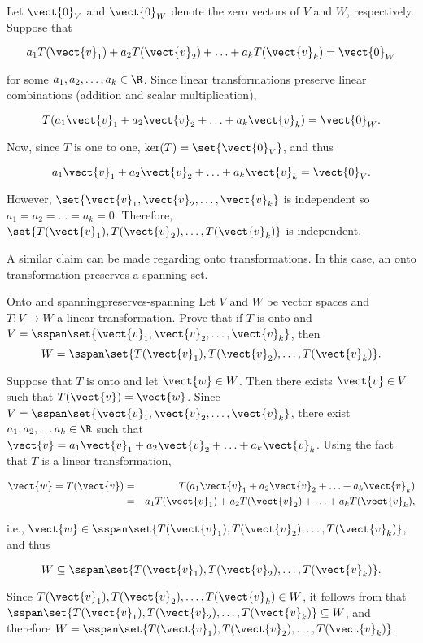 \begin{solution}
Let $\vect{0}_V$ and $\vect{0}_W$ denote the zero vectors of $V$ and $W$,
respectively.
Suppose that

\[ a_1T(\vect{v}_1) + a_2T(\vect{v}_2) +\ldots +a_kT(\vect{v}_k) =\vect{0}_W \]

for some $a_1, a_2, \ldots, a_k\in\R$.
Since linear transformations preserve linear combinations (addition
and scalar multiplication),

\[ T(a_1\vect{v}_1 + a_2\vect{v}_2 +\ldots +a_k\vect{v}_k) =\vect{0}_W. \]

Now, since $T$ is one to one, $\ker(T)=\set{\vect{0}_V}$, and thus

\[ a_1\vect{v}_1 + a_2\vect{v}_2 +\ldots +a_k\vect{v}_k =\vect{0}_V. \]

\noindent However, $\set{\vect{v}_1, \vect{v}_2, \ldots, \vect{v}_k}$ is independent so $a_1=a_2=\ldots=a_k=0$.
Therefore, $\set{T(\vect{v}_1), T(\vect{v}_2), \ldots, T(\vect{v}_k)}$
is independent.
\end{solution}

A similar claim can be made regarding onto transformations. In this case, an onto transformation preserves a spanning set.

\begin{example}{Onto and spanning}{preserves-spanning}
Let $V$ and $W$ be vector spaces and $T:V\to W$ a linear
transformation.
Prove that if $T$ is onto and
$V=\sspan\set{\vect{v}_1, \vect{v}_2, \ldots, \vect{v}_k}$,
then
\[ W=\sspan\set{T(\vect{v}_1), T(\vect{v}_2), \ldots, T(\vect{v}_k)}.\]
\end{example}

\begin{solution}
Suppose that $T$ is onto and let $\vect{w}\in W$.
Then there exists $\vect{v}\in V$ such that $T(\vect{v})=\vect{w}$.
Since $V=\sspan\set{\vect{v}_1, \vect{v}_2, \ldots, \vect{v}_k}$, there
exist $a_1, a_2, \ldots a_k\in\R$ such that
$\vect{v} = a_1\vect{v}_1 + a_2\vect{v}_2 + \ldots + a_k\vect{v}_k$.
Using the fact that $T$ is a linear transformation,

\begin{eqnarray*}
\vect{w}=T(\vect{v})
& = & T(a_1\vect{v}_1 + a_2\vect{v}_2 + \ldots + a_k\vect{v}_k) \\
& = & a_1T(\vect{v}_1) + a_2T(\vect{v}_2) + \ldots + a_kT(\vect{v}_k),
\end{eqnarray*}

i.e., $\vect{w}\in\sspan\set{T(\vect{v}_1), T(\vect{v}_2), \ldots, T(\vect{v}_k)}$,
and thus

\[ W\subseteq \sspan\set{T(\vect{v}_1), T(\vect{v}_2), \ldots, T(\vect{v}_k)}.\]

Since $T(\vect{v}_1), T(\vect{v}_2), \ldots, T(\vect{v}_k)\in W$,
it follows from
that
$\sspan\set{T(\vect{v}_1), T(\vect{v}_2), \ldots, T(\vect{v}_k)}\subseteq W$,
and therefore
$W=\sspan\set{T(\vect{v}_1), T(\vect{v}_2), \ldots, T(\vect{v}_k)}$.
\end{solution}
